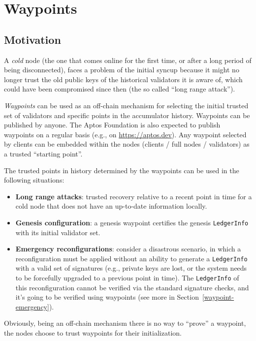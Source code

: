 \documentclass[letterpaper,10pt]{article}
\begin{document}
\section{Waypoints}
\label{waypoints}
\subsection{Motivation}
\label{waypoint-motivation}
A \emph{cold} node (the one that comes online for the first time, or after a long period of being disconnected), faces a problem of the initial syncup because it might no longer trust the old public keys of the historical validators it is aware of, which could have been compromised since then (the so called “long range attack”).

\emph{Waypoints} can be used  as an off-chain mechanism for selecting the initial trusted set of validators and specific points in the accumulator history. Waypoints can be published by anyone. The Aptos Foundation is also expected to publish waypoints on a regular basis (e.g., on \url{https://aptos.dev}). Any waypoint selected by clients can be embedded within the nodes (clients / full nodes / validators) as a trusted “starting point”.

The trusted points in history determined by the waypoints can be used in the following situations:
\begin{itemize}
\item \textbf{Long range attacks}: trusted recovery relative to a recent point in time for a cold node that does not have an up-to-date information locally.
\item \textbf{Genesis configuration}: a genesis waypoint certifies the genesis \texttt{LedgerInfo} with its initial validator set.
\item \textbf{Emergency reconfigurations}: consider a disastrous scenario, in which a reconfiguration must be applied without an ability to generate a \texttt{LedgerInfo} with a valid set of signatures (e.g., private keys are lost, or the system needs to be forcefully upgraded to a previous point in time). The \texttt{LedgerInfo} of this reconfiguration cannot be verified via the standard signature checks, and it's going to be verified using waypoints (see more in Section~\ref{waypoint-emergency}).
\end{itemize}

Obviously, being an off-chain mechanism there is no way to “prove” a waypoint, the nodes choose to trust waypoints for their initialization.
\end{document}
